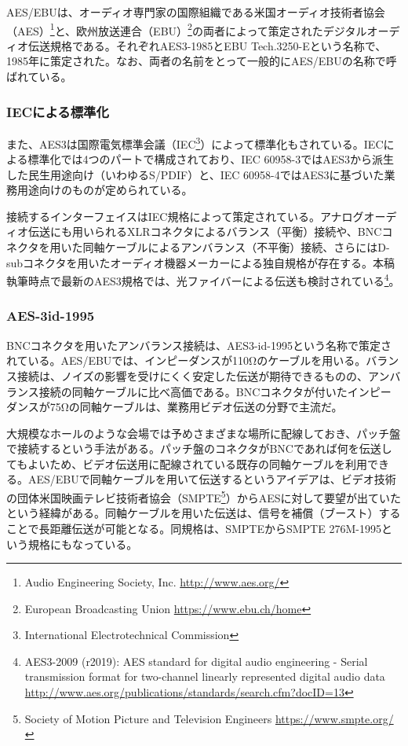 AES/EBUは、オーディオ専門家の国際組織である米国オーディオ技術者協会（AES）\footnote{Audio Engineering Society, Inc. \url{http://www.aes.org/}}と、欧州放送連合（EBU）\footnote{European Broadcasting Union \url{https://www.ebu.ch/home}}の両者によって策定されたデジタルオーディオ伝送規格である。それぞれAES3-1985\cite{aes3-1985}とEBU Tech.3250-E\cite{ebutech-3250-e}という名称で、1985年に策定された。なお、両者の名前をとって一般的にAES/EBUの名称で呼ばれている。

\subsubsection{IECによる標準化}

また、AES3は国際電気標準会議（IEC\footnote{International Electrotechnical Commission}）によって標準化もされている。IECによる標準化では4つのパートで構成されており、IEC 60958-3ではAES3から派生した民生用途向け（いわゆるS/PDIF）と、IEC 60958-4ではAES3に基づいた業務用途向けのものが定められている。

接続するインターフェイスはIEC規格によって策定されている。アナログオーディオ伝送にも用いられるXLRコネクタによるバランス（平衡）接続や、BNCコネクタを用いた同軸ケーブルによるアンバランス（不平衡）接続、さらにはD-subコネクタを用いたオーディオ機器メーカーによる独自規格が存在する。本稿執筆時点で最新のAES3規格では、光ファイバーによる伝送も検討されている\footnote{AES3-2009 (r2019): AES standard for digital audio engineering - Serial transmission format for two-channel linearly represented digital audio data \url{http://www.aes.org/publications/standards/search.cfm?docID=13}}。

\subsubsection{AES-3id-1995}

BNCコネクタを用いたアンバランス接続は、AES3-id-1995という名称で策定されている。AES/EBUでは、インピーダンスが110Ωのケーブルを用いる。バランス接続は、ノイズの影響を受けにくく安定した伝送が期待できるものの、アンバランス接続の同軸ケーブルに比べ高価である。BNCコネクタが付いたインピーダンスが75Ωの同軸ケーブルは、業務用ビデオ伝送の分野で主流だ。

大規模なホールのような会場では予めさまざまな場所に配線しておき、パッチ盤で接続するという手法がある。パッチ盤のコネクタがBNCであれば何を伝送してもよいため、ビデオ伝送用に配線されている既存の同軸ケーブルを利用できる。AES/EBUで同軸ケーブルを用いて伝送するというアイデアは、ビデオ技術の団体米国映画テレビ技術者協会（SMPTE\footnote{Society of Motion Picture and Television Engineers \url{https://www.smpte.org/}}）からAESに対して要望が出ていたという経緯がある\cite{aes3id-1995-column}。同軸ケーブルを用いた伝送は、信号を補償（ブースト）することで長距離伝送が可能となる。同規格は、SMPTEからSMPTE 276M-1995という規格にもなっている。

